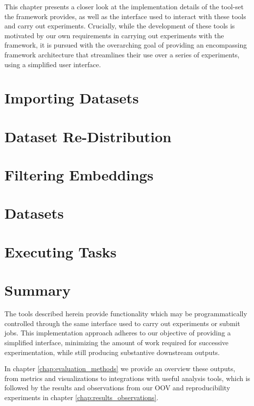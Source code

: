 \documentclass[../../fyp.tex]{subfiles}
\begin{document}
 
This chapter presents a closer look at the implementation details of the tool-set the framework provides, as well as the interface used to interact with these tools and carry out experiments. Crucially, while the development of these tools is motivated by our own requirements in carrying out experiments with the framework, it is pursued with the overarching goal of providing an encompassing framework architecture that streamlines their use over a series of experiments, using a simplified user interface. 

\section{Importing Datasets} \label{sec:importing_datasets}


\section{Dataset Re-Distribution} \label{sec:dataset_redist}


\section{Filtering Embeddings} \label{sec:filtering_embeddings}


\section{Datasets}


\section{Executing Tasks} \label{sec:executing_tasks}


\section{Summary}
The tools described herein provide functionality which may be programmatically controlled through the same interface used to carry out experiments or submit jobs. This implementation approach adheres to our objective of providing a simplified interface, minimizing the amount of work required for successive experimentation, while still producing substantive downstream outputs. 

In chapter \ref{chap:evaluation_methods} we provide an overview these outputs, from metrics and visualizations to integrations with useful analysis tools, which is followed by the results and observations from our OOV and reproducibility experiments in chapter \ref{chap:results_observations}.
\end{document}
